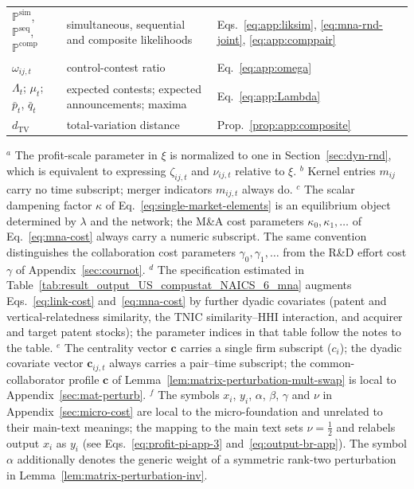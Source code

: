 \begin{table}[htbp]
{\begin{threeparttable}
{\begin{tabular}{@{} l l l @{}}
$\mathbb{P}^{\mathrm{sim}}$, $\mathbb{P}^{\mathrm{seq}}$, $\mathbb{P}^{\mathrm{comp}}$ & simultaneous, sequential and composite likelihoods & Eqs.~\eqref{eq:app:liksim}, \eqref{eq:mna-rnd-joint}, \eqref{eq:app:comppair} \\
$\omega_{ij,t}$ & control-contest ratio & Eq.~\eqref{eq:app:omega} \\
$\Lambda_t$; $\mu_t$; $\bar p_t$, $\bar q_t$ & expected contests; expected announcements; maxima & Eq.~\eqref{eq:app:Lambda} \\
$d_{\mathrm{TV}}$ & total-variation distance & Prop.~\ref{prop:app:composite} \\
\midrule
\bottomrule
\end{tabular}
}
\begin{tablenotes}[flushleft]
\item \small $^{a}$ The profit-scale parameter in $\xi$ is normalized to one in Section~\ref{sec:dyn-rnd}, which is equivalent to expressing $\zeta_{ij,t}$ and $\nu_{ij,t}$ relative to $\xi$.
$^{b}$ Kernel entries $m_{ij}$ carry no time subscript; merger
indicators $m_{ij,t}$ always do.
$^{c}$ The scalar dampening factor $\kappa$ of
Eq.~\eqref{eq:single-market-elements} is an equilibrium object
determined by $\lambda$ and the network; the M\&A cost parameters
$\kappa_0,\kappa_1,\dots$ of Eq.~\eqref{eq:mna-cost} always carry a
numeric subscript. The same convention distinguishes the collaboration
cost parameters $\gamma_0,\gamma_1,\dots$ from the R\&D effort cost
$\gamma$ of Appendix~\ref{sec:cournot}.
$^{d}$ The specification estimated in
Table~\ref{tab:result_output_US_compustat_NAICS_6_mna} augments
Eqs.~\eqref{eq:link-cost} and~\eqref{eq:mna-cost} by further dyadic
covariates (patent and vertical-relatedness similarity, the TNIC
similarity--HHI interaction, and acquirer and target patent stocks); the
parameter indices in that table follow the notes to the table.
$^{e}$ The centrality vector $\mathbf{c}$ carries a single firm subscript
($c_i$); the dyadic covariate vector $\mathbf{c}_{ij,t}$ always carries a
pair--time subscript; the common-collaborator profile $\mathbf{c}$ of
Lemma~\ref{lem:matrix-perturbation-mult-swap} is local to
Appendix~\ref{sec:mat-perturb}.
$^{f}$ The symbols $x_i$, $y_i$, $\alpha$, $\beta$, $\gamma$ and $\nu$ in
Appendix~\ref{sec:micro-cost} are local to the micro-foundation and
unrelated to their main-text meanings; the mapping to the main text sets
$\nu=\tfrac{1}{2}$ and relabels output $x_i$ as $y_i$ (see
Eqs.~\eqref{eq:profit-pi-app-3} and~\eqref{eq:output-br-app}). The
symbol $\alpha$ additionally denotes the generic weight of a symmetric
rank-two perturbation in Lemma~\ref{lem:matrix-perturbation-inv}.
\end{tablenotes}
\end{threeparttable}}
\end{table}


